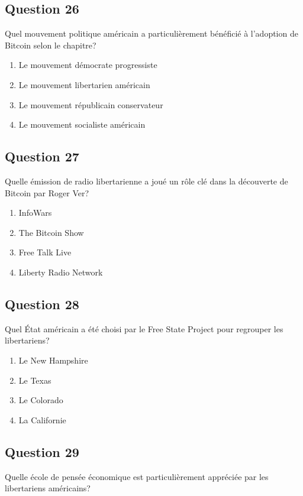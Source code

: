 \documentclass[12pt,a4paper]{article}
\begin{document}
\bigskip


\subsection*{Question 26}
Quel mouvement politique américain a particulièrement bénéficié à l'adoption de Bitcoin selon le chapitre?

\begin{enumerate}[label=\Alph*., leftmargin=*]
\item Le mouvement démocrate progressiste
\item Le mouvement libertarien américain
\item Le mouvement républicain conservateur
\item Le mouvement socialiste américain
\end{enumerate}

\bigskip


\subsection*{Question 27}
Quelle émission de radio libertarienne a joué un rôle clé dans la découverte de Bitcoin par Roger Ver?

\begin{enumerate}[label=\Alph*., leftmargin=*]
\item InfoWars
\item The Bitcoin Show
\item Free Talk Live
\item Liberty Radio Network
\end{enumerate}

\bigskip


\subsection*{Question 28}
Quel État américain a été choisi par le Free State Project pour regrouper les libertariens?

\begin{enumerate}[label=\Alph*., leftmargin=*]
\item Le New Hampshire
\item Le Texas
\item Le Colorado
\item La Californie
\end{enumerate}

\bigskip


\subsection*{Question 29}
Quelle école de pensée économique est particulièrement appréciée par les libertariens américains?
\end{document}
